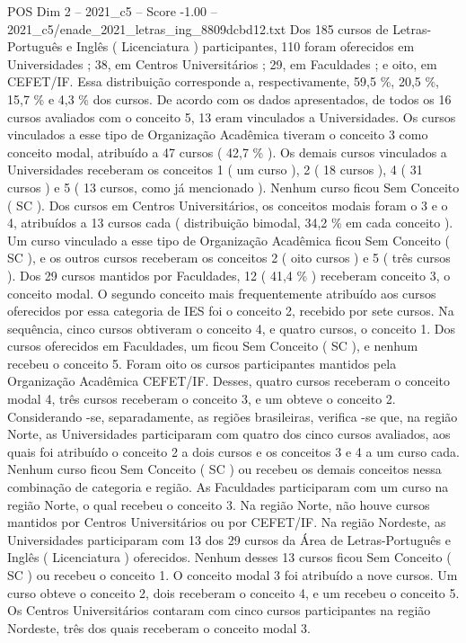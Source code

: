\begin{textsample}{POS Dim 2 – 2021\_c5 – Score -1.00 – 2021\_c5/enade\_2021\_letras\_ing\_8809dcbd12.txt}
Dos 185 cursos de Letras-Português e Inglês ( Licenciatura ) participantes, 110 foram oferecidos em Universidades ; 38, em Centros Universitários ; 29, em Faculdades ; e oito, em CEFET/IF.
Essa distribuição corresponde a, respectivamente, 59,5 \%, 20,5 \%, 15,7 \% e 4,3 \% dos cursos.
De acordo com os dados apresentados, de todos os 16 cursos avaliados com o conceito 5, 13 eram vinculados a Universidades.
Os cursos vinculados a esse tipo de Organização Acadêmica tiveram o conceito 3 como conceito modal, atribuído a 47 cursos ( 42,7 \% ).
Os demais cursos vinculados a Universidades receberam os conceitos 1 ( um curso ), 2 ( 18 cursos ), 4 ( 31 cursos ) e 5 ( 13 cursos, como já mencionado ).
Nenhum curso ficou Sem Conceito ( SC ).
Dos cursos em Centros Universitários, os conceitos modais foram o 3 e o 4, atribuídos a 13 cursos cada ( distribuição bimodal, 34,2 \% em cada conceito ).
Um curso vinculado a esse tipo de Organização Acadêmica ficou Sem Conceito ( SC ), e os outros cursos receberam os conceitos 2 ( oito cursos ) e 5 ( três cursos ).
Dos 29 cursos mantidos por Faculdades, 12 ( 41,4 \% ) receberam conceito 3, o conceito modal.
O segundo conceito mais frequentemente atribuído aos cursos oferecidos por essa categoria de IES foi o conceito 2, recebido por sete cursos.
Na sequência, cinco cursos obtiveram o conceito 4, e quatro cursos, o conceito 1.
Dos cursos oferecidos em Faculdades, um ficou Sem Conceito ( SC ), e nenhum recebeu o conceito 5.
Foram oito os cursos participantes mantidos pela Organização Acadêmica CEFET/IF.
Desses, quatro cursos receberam o conceito modal 4, três cursos receberam o conceito 3, e um obteve o conceito 2.
Considerando -se, separadamente, as regiões brasileiras, verifica -se que, na região Norte, as Universidades participaram com quatro dos cinco cursos avaliados, aos quais foi atribuído o conceito 2 a dois cursos e os conceitos 3 e 4 a um curso cada.
Nenhum curso ficou Sem Conceito ( SC ) ou recebeu os demais conceitos nessa combinação de categoria e região.
As Faculdades participaram com um curso na região Norte, o qual recebeu o conceito 3.
Na região Norte, não houve cursos mantidos por Centros Universitários ou por CEFET/IF.
Na região Nordeste, as Universidades participaram com 13 dos 29 cursos da Área de Letras-Português e Inglês ( Licenciatura ) oferecidos.
Nenhum desses 13 cursos ficou Sem Conceito ( SC ) ou recebeu o conceito 1.
O conceito modal 3 foi atribuído a nove cursos.
Um curso obteve o conceito 2, dois receberam o conceito 4, e um recebeu o conceito 5.
Os Centros Universitários contaram com cinco cursos participantes na região Nordeste, três dos quais receberam o conceito modal 3.

\end{textsample}

